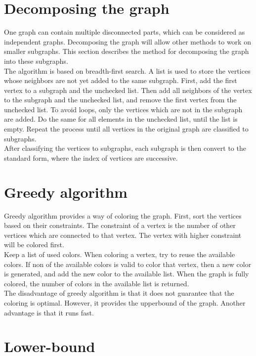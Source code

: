 \documentclass[a4paper]{report}
\begin{document}
		\section{Decomposing the graph}
		One graph can contain multiple disconnected parts, which can be considered as independent graphs. Decomposing the graph will allow other methods to work on smaller subgraphs. This section describes the method for decomposing the graph into these subgraphs.\\
		The algorithm is based on breadth-first search. A list is used to store the vertices whose neighbors are not yet added to the same subgraph. First, add the first vertex to a subgraph and the unchecked list. Then add all neighbors of the vertex to the subgraph and the unchecked list, and remove the first vertex from the unchecked list. To avoid loops, only the vertices which are not in the subgraph are added. Do the same for all elements in the unchecked list, until the list is empty. Repeat the process until all vertices in the original graph are classified to subgraphs.\\
		After classifying the vertices to subgraphs, each subgraph is then convert to the standard form, where the index of vertices are successive.
		
		\section{Greedy algorithm}
		Greedy algorithm provides a way of coloring the graph. First, sort the vertices based on their constraints. The constraint of a vertex is  the number of other vertices which are connected to that vertex. The vertex with higher constraint will be colored first.\\
		Keep a list of used colors. When coloring a vertex, try to reuse the available colors. If non of the available colors is valid to color that vertex, then  a new color is generated, and add the new color to the available list. When the graph is fully colored, the number of colors in the available list is returned.\\
		The disadvantage of greedy algorithm is that it does not guarantee that the coloring is optimal. However, it provides the upperbound of the graph. Another advantage is that it runs fast.
		
		\section{Lower-bound}
		
\end{document}
